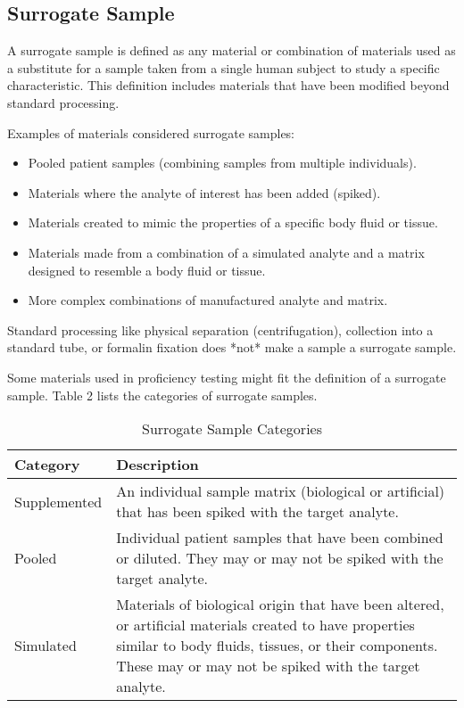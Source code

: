 \documentclass{article}
\begin{document}
\subsection{Surrogate Sample}

A surrogate sample is defined as any material or combination of materials used as a substitute for a sample taken from a single human subject to study a specific characteristic. This definition includes materials that have been modified beyond standard processing.

Examples of materials considered surrogate samples:
\begin{itemize}
    \item Pooled patient samples (combining samples from multiple individuals).
    \item Materials where the analyte of interest has been added (spiked).
    \item Materials created to mimic the properties of a specific body fluid or tissue.
    \item Materials made from a combination of a simulated analyte and a matrix designed to resemble a body fluid or tissue.
    \item More complex combinations of manufactured analyte and matrix.
\end{itemize}

Standard processing like physical separation (centrifugation), collection into a standard tube, or formalin fixation does *not* make a sample a surrogate sample.

Some materials used in proficiency testing might fit the definition of a surrogate sample. Table 2 lists the categories of surrogate samples.

\begin{table}[h!]
\centering
\caption{Surrogate Sample Categories \cite{CLSIEP39Ed1E}}
\begin{tabular}{>{\raggedright\arraybackslash}p{3cm} >{\raggedright\arraybackslash}p{10cm}}
\toprule
\textbf{Category} & \textbf{Description} \\
\midrule
Supplemented & An individual sample matrix (biological or artificial) that has been spiked with the target analyte. \\
Pooled & Individual patient samples that have been combined or diluted. They may or may not be spiked with the target analyte. \\
Simulated & Materials of biological origin that have been altered, or artificial materials created to have properties similar to body fluids, tissues, or their components. These may or may not be spiked with the target analyte. \\
\bottomrule
\end{tabular}
\end{table}
\end{document}
